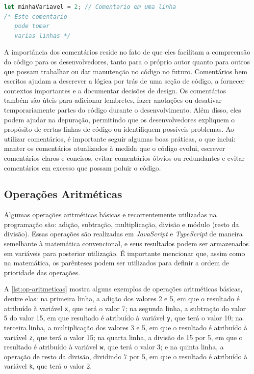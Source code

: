 \begin{lstlisting}[language=TypeScript, label=lst:coment, caption=Exemplo de Comentário em JS e TS.]
let minhaVariavel = 2; // Comentario em uma linha
/* Este comentario
   pode tomar
   varias linhas */
\end{lstlisting}

A importância dos comentários reside no fato de que eles facilitam a compreensão do código para os desenvolvedores, tanto para o próprio autor quanto para outros que possam trabalhar ou dar manutenção no código no futuro. Comentários bem escritos ajudam a descrever a lógica por trás de uma seção de código, a fornecer contextos importantes e a documentar decisões de design. Os comentários também são úteis para adicionar lembretes, fazer anotações ou desativar temporariamente partes do código durante o desenvolvimento. Além disso, eles podem ajudar na depuração, permitindo que os desenvolvedores expliquem o propósito de certas linhas de código ou identifiquem possíveis problemas. Ao utilizar comentários, é importante seguir algumas boas práticas, o que inclui: manter os comentários atualizados à medida que o código evolui, escrever comentários claros e concisos, evitar comentários óbvios ou redundantes e evitar comentários em excesso que possam poluir o código.

\subsection{Operações Aritméticas}

Algumas operações aritméticas básicas e recorrentemente utilizadas na programação são: adição, subtração, multiplicação, divisão e módulo (resto da divisão). Essas operações são realizadas em \textit{JavaScript} e \textit{TypeScript} de maneira semelhante à matemática convencional, e seus resultados podem ser armazenados em variáveis para posterior utilização. É importante mencionar que, assim como na matemática, os parênteses podem ser utilizados para definir a ordem de prioridade das operações.

A \autoref{lst:op-aritmeticas} mostra alguns exemplos de operações aritméticas básicas, dentre elas: na primeira linha, a adição dos valores 2 e 5, em que o resultado é atribuído à variável \texttt{x}, que terá o valor 7; na segunda linha, a subtração do valor 5 do valor 15, em que resultado é atribuído à variável \texttt{y}, que terá o valor 10; na terceira linha, a multiplicação dos valores 3 e 5, em que o resultado é atribuído à variável \texttt{z}, que terá o valor 15; na quarta linha, a divisão de 15 por 5, em que o resultado é atribuído à variável \texttt{w}, que terá o valor 3; e na quinta linha, a operação de resto da divisão, dividindo 7 por 5, em que o resultado é atribuído à variável \texttt{k}, que terá o valor 2.


